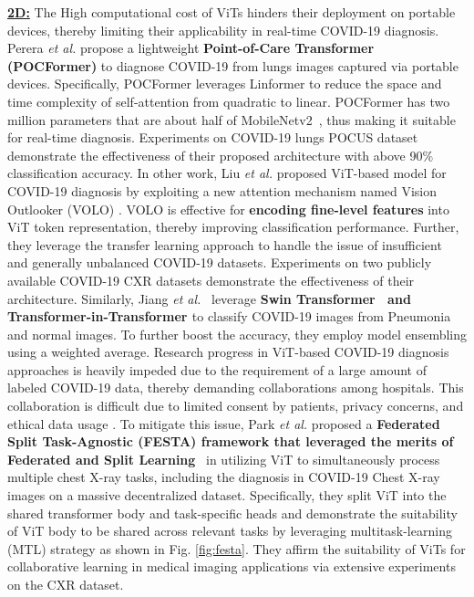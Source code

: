 \documentclass[10pt,journal,compsoc]{IEEEtran}
\begin{document}
 {\underline{\textbf{2D:}}} The High computational cost of ViTs hinders their deployment on portable devices, thereby limiting their applicability in real-time COVID-19 diagnosis. Perera \textit{et al.}\cite{perera2021pocformer} propose a lightweight \textbf{Point-of-Care Transformer (POCFormer)} to diagnose COVID-19 from lungs images captured via portable devices. Specifically, POCFormer leverages Linformer \cite{wang2020linformer} to reduce the space and time complexity of self-attention from quadratic to linear. POCFormer has two million parameters that are about half of MobileNetv2~\cite{sandler2018mobilenetv2}, thus making it suitable for real-time diagnosis. Experiments on COVID-19 lungs POCUS dataset \cite{born2020pocovid,cohen2020covid} demonstrate the effectiveness of their proposed architecture with above 90$\%$ classification accuracy. %
In other work, Liu \textit{et al.} \cite{liu2021automatic} proposed ViT-based model for COVID-19 diagnosis by exploiting a new attention mechanism named Vision Outlooker (VOLO) \cite{yuan2021volo}. VOLO is effective for \textbf{encoding fine-level features} into ViT token representation, thereby improving classification performance.
Further, they leverage the transfer learning approach to handle the issue of insufficient and generally unbalanced COVID-19 datasets. Experiments on two publicly available COVID-19 CXR datasets \cite{chowdhury2020can,cohen2020covid} demonstrate the effectiveness of their architecture. %
Similarly, Jiang \textit{et al.}~\cite{jiang2021covid} leverage \textbf{Swin Transformer~\cite{liu2021swin} and Transformer-in-Transformer \cite{han2021transformer}} to classify COVID-19 images from Pneumonia and normal images. To further boost the accuracy, they employ model ensembling using a weighted average. Research progress in ViT-based COVID-19 diagnosis approaches is heavily impeded due to the requirement of a large amount of labeled COVID-19 data, thereby demanding collaborations among hospitals. This collaboration is difficult due to limited consent by patients, privacy concerns, and ethical data usage \cite{dou2021federated}. To mitigate this issue, Park \textit{et al.} \cite{park2021federated} proposed a \textbf{Federated Split Task-Agnostic (FESTA) framework that leveraged the merits of Federated and Split Learning}~\cite{yang2019federated,vepakomma2018split} in utilizing ViT to simultaneously process multiple chest X-ray tasks, including the diagnosis in COVID-19 Chest X-ray images on a massive decentralized dataset. Specifically, they split ViT into the shared transformer body and task-specific heads and demonstrate the suitability of ViT body to be shared across relevant tasks by leveraging multitask-learning (MTL) \cite{caruana1997multitask} strategy as shown in Fig. \ref{fig:festa}. They affirm the suitability of ViTs for collaborative learning in medical imaging applications via extensive experiments on the CXR dataset. %
\end{document}
